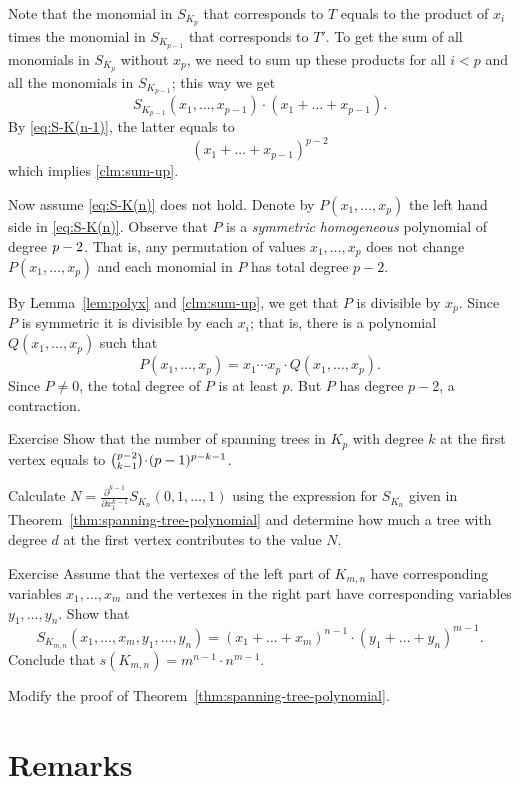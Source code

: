 Note that the monomial in $S_{K_p}$ that corresponds to $T$ equals 
to the product of $x_i$ times the monomial in $S_{K_{p-1}}$
that corresponds to $T'$.
To get the sum of all monomials in $S_{K_p}$ without $x_p$, we need to sum up these products for all $i<p$ and all the monomials in $S_{K_{p-1}}$; this way we get 
\[S_{K_{p-1}}(x_1,\dots,x_{p-1})\cdot(x_1+\dots+x_{p-1}).\]
By \ref{eq:S-K(n-1)}, the latter equals to
\[(x_1+\dots+x_{p-1})^{p-2}\]
which implies \ref{clm:sum-up}.

Now assume \ref{eq:S-K(n)} does not hold.
Denote by $P(x_1,\dots,x_p)$ the left hand side in \ref{eq:S-K(n)}.
Observe that $P$ is a {}\emph{symmetric} {}\emph{homogeneous} polynomial of degree $p\z-2$.
That is, any permutation of values $x_1,\dots, x_p$ does not change $P(x_1,\dots,x_p)$ and each monomial in $P$ has total degree $p-2$.

By Lemma~\ref{lem:polyx} and \ref{clm:sum-up}, we get that $P$ is divisible by $x_p$.
Since $P$ is symmetric it is divisible by each $x_i$;
that is, there is a polynomial $Q(x_1,\dots,x_p)$ such that 
\[P(x_1,\dots,x_p)=x_1\cdots x_p\cdot Q(x_1,\dots,x_p).\]
Since $P\ne 0$, the total degree of $P$ is at least $p$.
But $P$ has degree $p-2$, a contraction.
\qeds

\begin{thm}{Exercise}
Show that the number of spanning trees in $K_p$ with degree $k$ at the first vertex equals to $\tbinom{p-2}{k-1}\cdot (p-1)^{p-k-1}$.
\end{thm}

 Calculate $N=\tfrac{\partial^{k-1} }{\partial x_1^{k-1}}S_{K_n}(0,1,\dots,1)$ using the expression for $S_{K_n}$ given in Theorem~\ref{thm:spanning-tree-polynomial} and determine how much a tree with degree $d$ at the first vertex contributes to the value $N$.


\begin{thm}{Exercise}
Assume that the vertexes of the left part of $K_{m,n}$ have corresponding variables $x_1,\dots,x_m$ and the vertexes in the right part have corresponding variables $y_1,\dots,y_n$. 
Show that
\[S_{K_{m,n}}(x_1,\dots,x_m,y_1,\dots,y_n)=(x_1+\dots +x_m)^{n-1}\cdot(y_1+\dots +y_n)^{m-1}.\]
Conclude that $s(K_{m,n})=m^{n-1}\cdot n^{m-1}$.

\end{thm}

 Modify the proof of Theorem~\ref{thm:spanning-tree-polynomial}.

\section*{Remarks}

